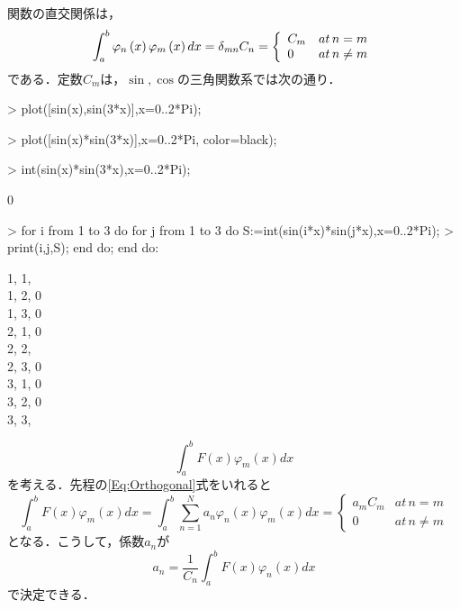 関数の直交関係は，
\begin{equation}
\int _{a}^{b}\varphi _{n} \left( x \right) \varphi _{m} \left( x \right) {dx}=
\delta_{\it mn}C_{n}= \left\{\begin{array}{lr}
C_m & at\, n=m \\
0 & at\, n\neq m
\end{array}\right.
\label{Eq:Orthogonal}
\end{equation}
である．定数$C_m$は，$\sin,\cos$の三角関数系では次の通り．
\begin{MapleInput}
> plot([sin(x),sin(3*x)],x=0..2*Pi);
\end{MapleInput}

\begin{MapleInput}
> plot([sin(x)*sin(3*x)],x=0..2*Pi, color=black);
\end{MapleInput}

\begin{MapleInput}
> int(sin(x)*sin(3*x),x=0..2*Pi);
\end{MapleInput}
\begin{MapleOutput}
0
\end{MapleOutput}
\begin{MapleInput}
> for i from 1 to 3 do for j from 1 to 3 do S:=int(sin(i*x)*sin(j*x),x=0..2*Pi);
> print(i,j,S); end do; end do:
\end{MapleInput}
\begin{MapleOutputGather}
1, 1, \pi \notag \\
1, 2, 0 \notag \\
1, 3, 0 \notag \\
2, 1, 0 \notag \\
2, 2, \pi \notag \\
2, 3, 0 \notag \\
3, 1, 0 \notag \\
3, 2, 0 \notag \\
3, 3, \pi \notag
\end{MapleOutputGather}
\begin{equation*}
\int _{a}^{b}F \left( x \right) \varphi _{m} \left( x \right) {dx}
\end{equation*}
を考える．先程の\ref{Eq:Orthogonal}式をいれると
\begin{equation}
\int _{a }^{b }F \left(x \right)\varphi _{m }\left(x \right) dx =\int _{a }^{b }{\sum^N_{n=1} }a _{n }\varphi _{n }\left(x \right)\varphi _{m }\left(x \right)d x = 
\left\{\begin{array}{lr}
a_m C_m & at\, n=m \\
0 & at\, n\neq m
\end{array}\right.
\end{equation}
となる．こうして，係数$a_n$が
\begin{equation*}
a_{{n}}=\frac {1}{C_n}\int _{a}^{b} F \left( x \right) \varphi _{{n}} \left( x \right) {dx}
\end{equation*}
で決定できる．
